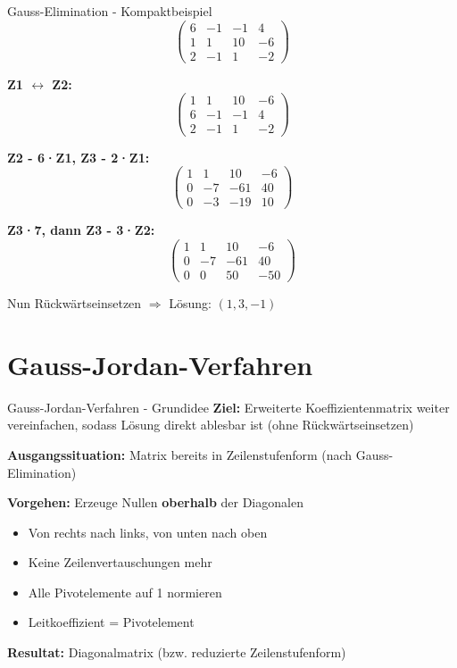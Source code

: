 \documentclass[a4paper, fontsize=7pt]{scrartcl}
\begin{document}
\begin{subbox}{Gauss-Elimination - Kompaktbeispiel}
$$\left(\begin{array}{ccc|c}
6 & -1 & -1 & 4 \\
1 & 1 & 10 & -6 \\
2 & -1 & 1 & -2
\end{array}\right)$$

\textbf{Z1 $\leftrightarrow$ Z2:}
$$\left(\begin{array}{ccc|c}
1 & 1 & 10 & -6 \\
6 & -1 & -1 & 4 \\
2 & -1 & 1 & -2
\end{array}\right)$$

\textbf{Z2 - 6·Z1, Z3 - 2·Z1:}
$$\left(\begin{array}{ccc|c}
1 & 1 & 10 & -6 \\
0 & -7 & -61 & 40 \\
0 & -3 & -19 & 10
\end{array}\right)$$

\textbf{Z3·7, dann Z3 - 3·Z2:}
$$\left(\begin{array}{ccc|c}
1 & 1 & 10 & -6 \\
0 & -7 & -61 & 40 \\
0 & 0 & 50 & -50
\end{array}\right)$$

Nun Rückwärtseinsetzen $\Rightarrow$ Lösung: $(1, 3, -1)$
\end{subbox}

\section{Gauss-Jordan-Verfahren}

\begin{mainbox}{Gauss-Jordan-Verfahren - Grundidee}
\textbf{Ziel:} Erweiterte Koeffizientenmatrix weiter vereinfachen, sodass Lösung direkt ablesbar ist (ohne Rückwärtseinsetzen)

\textbf{Ausgangssituation:} Matrix bereits in Zeilenstufenform (nach Gauss-Elimination)

\textbf{Vorgehen:} Erzeuge Nullen \textbf{oberhalb} der Diagonalen
\begin{itemize}
    \item Von rechts nach links, von unten nach oben
    \item Keine Zeilenvertauschungen mehr
    \item Alle Pivotelemente auf 1 normieren
    \item Leitkoeffizient = Pivotelement
\end{itemize}

\textbf{Resultat:} Diagonalmatrix (bzw. reduzierte Zeilenstufenform)
\end{mainbox}
\end{document}

